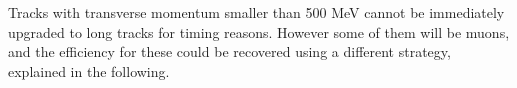 Tracks with transverse momentum smaller than 500 MeV cannot be immediately upgraded to long tracks for timing reasons.
However some of them will be muons, and the efficiency for these could be recovered using a different strategy,
explained in the following.


